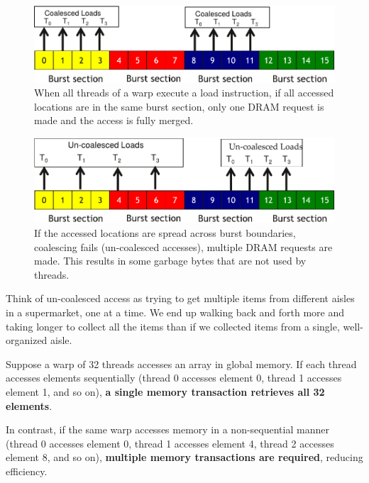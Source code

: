 \begin{figure}[!htp]
    \centering
    \includegraphics[width=.8\textwidth]{img/cuda-memory-coalescing-1.pdf}
    \caption{When all threads of a warp execute a load instruction, if all accessed locations are in the same burst section, only one DRAM request is made and the access is fully merged.}
\end{figure}

\begin{figure}[!htp]
    \centering
    \includegraphics[width=.8\textwidth]{img/cuda-memory-un-coalesced-1.pdf}
    \caption{If the accessed locations are spread across burst boundaries, coalescing fails (un-coalesced accesses), multiple DRAM requests are made. This results in some garbage bytes that are not used by threads.}
\end{figure}

\begin{examplebox}
    Think of un-coalesced access as trying to get multiple items from different aisles in a supermarket, one at a time. We end up walking back and forth more and taking longer to collect all the items than if we collected items from a single, well-organized aisle.
\end{examplebox}

\newpage

\begin{examplebox}
    Suppose a warp of 32 threads accesses an array in global memory. If each thread accesses elements sequentially (thread 0 accesses element 0, thread 1 accesses element 1, and so on), \textbf{a single memory transaction retrieves all 32 elements}.

    In contrast, if the same warp accesses memory in a non-sequential manner (thread 0 accesses element 0, thread 1 accesses element 4, thread 2 accesses element 8, and so on), \textbf{multiple memory transactions are required}, reducing efficiency.
\end{examplebox}

